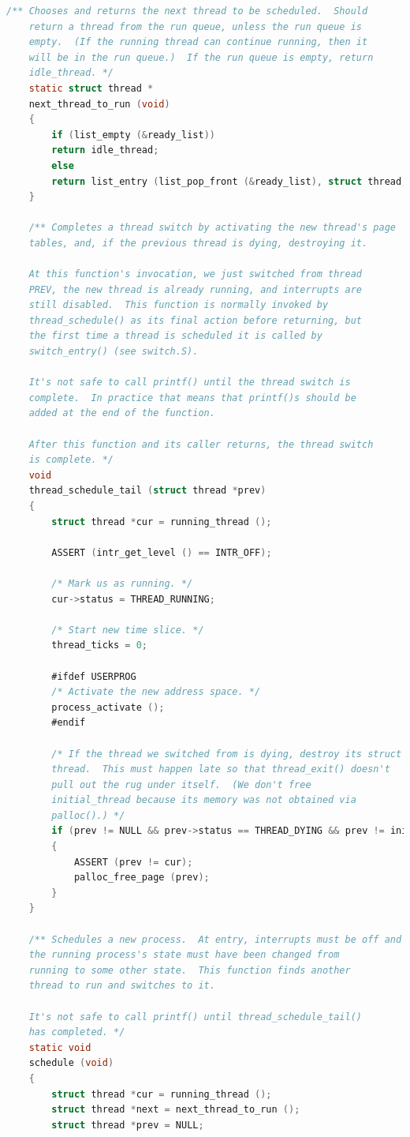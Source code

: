 \documentclass{article}
\begin{document}
\begin{lstlisting}[language=C, title=\texttt{pintos/src/threads/thread.c}]
	/** Chooses and returns the next thread to be scheduled.  Should
	return a thread from the run queue, unless the run queue is
	empty.  (If the running thread can continue running, then it
	will be in the run queue.)  If the run queue is empty, return
	idle_thread. */
	static struct thread *
	next_thread_to_run (void) 
	{
		if (list_empty (&ready_list))
		return idle_thread;
		else
		return list_entry (list_pop_front (&ready_list), struct thread, elem);
	}
	
	/** Completes a thread switch by activating the new thread's page
	tables, and, if the previous thread is dying, destroying it.
	
	At this function's invocation, we just switched from thread
	PREV, the new thread is already running, and interrupts are
	still disabled.  This function is normally invoked by
	thread_schedule() as its final action before returning, but
	the first time a thread is scheduled it is called by
	switch_entry() (see switch.S).
	
	It's not safe to call printf() until the thread switch is
	complete.  In practice that means that printf()s should be
	added at the end of the function.
	
	After this function and its caller returns, the thread switch
	is complete. */
	void
	thread_schedule_tail (struct thread *prev)
	{
		struct thread *cur = running_thread ();
		
		ASSERT (intr_get_level () == INTR_OFF);
		
		/* Mark us as running. */
		cur->status = THREAD_RUNNING;
		
		/* Start new time slice. */
		thread_ticks = 0;
		
		#ifdef USERPROG
		/* Activate the new address space. */
		process_activate ();
		#endif
		
		/* If the thread we switched from is dying, destroy its struct
		thread.  This must happen late so that thread_exit() doesn't
		pull out the rug under itself.  (We don't free
		initial_thread because its memory was not obtained via
		palloc().) */
		if (prev != NULL && prev->status == THREAD_DYING && prev != initial_thread) 
		{
			ASSERT (prev != cur);
			palloc_free_page (prev);
		}
	}
	
	/** Schedules a new process.  At entry, interrupts must be off and
	the running process's state must have been changed from
	running to some other state.  This function finds another
	thread to run and switches to it.
	
	It's not safe to call printf() until thread_schedule_tail()
	has completed. */
	static void
	schedule (void) 
	{
		struct thread *cur = running_thread ();
		struct thread *next = next_thread_to_run ();
		struct thread *prev = NULL;
		

\end{lstlisting}
\end{document}
